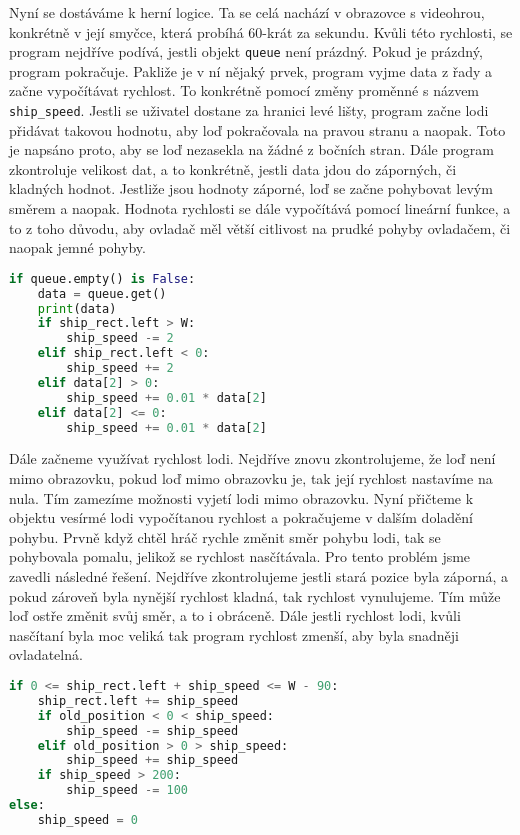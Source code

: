\documentclass[12pt]{report}			%
\begin{document}
Nyní se dostáváme k herní logice. Ta se celá nachází v obrazovce s videohrou, konkrétně v její smyčce, která probíhá 60-krát za sekundu. Kvůli této rychlosti, se program nejdříve podívá, jestli objekt \texttt{queue} není prázdný. Pokud je prázdný, program pokračuje. Pakliže je v ní nějaký prvek, program vyjme data z řady a začne vypočítávat rychlost. 
To konkrétně pomocí změny proměnné s názvem \texttt{ship\_speed}. Jestli se uživatel dostane za hranici levé lišty, program začne lodi přidávat takovou hodnotu, aby loď pokračovala na pravou stranu a naopak. Toto je napsáno proto, aby se loď nezasekla na žádné z bočních stran. Dále program zkontroluje velikost dat, 
a to konkrétně, jestli data jdou do záporných, či kladných hodnot. Jestliže jsou hodnoty záporné, loď se začne pohybovat levým směrem a naopak. Hodnota rychlosti se dále vypočítává pomocí lineární funkce, a to z toho důvodu, aby ovladač měl větší citlivost na prudké pohyby ovladačem, či naopak jemné pohyby. 



\begin{lstlisting}[title={Program game.py}, caption={game.py}, language=Python]
if queue.empty() is False:
	data = queue.get()
    print(data)
    if ship_rect.left > W: 
        ship_speed -= 2
    elif ship_rect.left < 0:  
        ship_speed += 2
    elif data[2] > 0:
        ship_speed += 0.01 * data[2] 
    elif data[2] <= 0:
        ship_speed += 0.01 * data[2]

\end{lstlisting}


Dále začneme využívat rychlost lodi. Nejdříve znovu zkontrolujeme, že loď není mimo obrazovku, pokud loď mimo obrazovku je, tak její rychlost nastavíme na nula. Tím zamezíme možnosti vyjetí lodi 
mimo obrazovku. Nyní přičteme k objektu vesírmé lodi vypočítanou rychlost a pokračujeme v dalším doladění pohybu. Prvně když chtěl hráč rychle změnit směr pohybu lodi, tak se pohybovala pomalu, jelikož se rychlost nasčítávala. Pro tento problém jsme zavedli následné řešení. Nejdříve zkontrolujeme jestli stará pozice byla záporná, a pokud zároveň byla nynější rychlost kladná, tak rychlost vynulujeme. Tím může loď ostře změnit svůj směr, a to i obráceně. Dále jestli rychlost lodi, kvůli nasčítaní byla moc veliká tak program rychlost zmenší, aby byla snadněji ovladatelná. 



\begin{lstlisting}[title={Program game.py}, caption={game.py}, language=Python]
if 0 <= ship_rect.left + ship_speed <= W - 90: 
    ship_rect.left += ship_speed
    if old_position < 0 < ship_speed:  
        ship_speed -= ship_speed
    elif old_position > 0 > ship_speed:  
        ship_speed += ship_speed
    if ship_speed > 200:  
        ship_speed -= 100
else:
    ship_speed = 0

\end{lstlisting}
\end{document}
